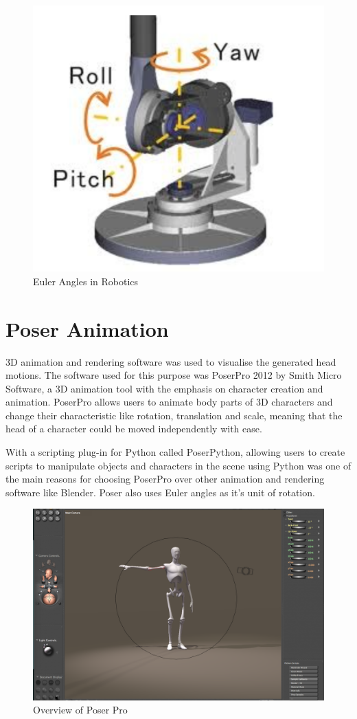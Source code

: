 \documentclass[bsc,frontabs,twoside,singlespacing,parskip]{infthesis}
\begin{document}
\begin{figure}[h!]
	\centering
	\includegraphics[width=.5\textwidth]{euler_angles.png}
	\caption{Euler Angles in Robotics}
\end{figure}


\section{Poser Animation}

3D animation and rendering software was used to visualise the generated head motions. The software used for this purpose was PoserPro 2012 by Smith Micro Software, a 3D animation tool with the emphasis on character creation and animation. PoserPro allows users to animate body parts of 3D characters and change their characteristic like rotation, translation and scale, meaning that the head of a character could be moved independently with ease.

With a scripting plug-in for Python called PoserPython, \cite{poser_python} allowing users to create scripts to manipulate objects and characters in the scene using Python was one of the main reasons for choosing PoserPro over other animation and rendering software like Blender. Poser also uses Euler angles as it's unit of rotation.

\begin{figure}
	\centering
		\includegraphics[width=1.0\textwidth]{poser.png}
		\caption{Overview of Poser Pro}
\end{figure}
\end{document}
